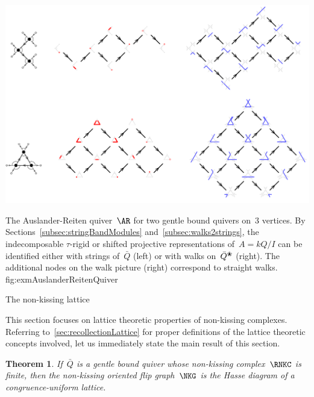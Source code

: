 \documentclass{memo-l}
\makeatletter
\newtheorem{theorem}{Theorem}[part]
\theoremstyle{definition}
\newcommand{\blossom}{^\text{\ding{96}}} %
\def\part{\@startsection{part}{1}%
\z@{.7\linespacing\@plus\linespacing}{.8\linespacing}%
{\LARGE\sffamily\centering}}
\makeatother
\begin{document}
\captionsetup{width=1.5\textwidth}
{\begin{minipage}{22cm}\vspace*{-1cm}\includegraphics[scale=.45]{exmAuslanderReitenQuiver}\end{minipage}}
{The Auslander-Reiten quiver~$\AR$ for two gentle bound quivers on~$3$ vertices. By Sections~\ref{subsec:stringBandModules} and~\ref{subsec:walks2strings}, the indecomposable $\tau$-rigid or shifted projective representations of~$A = kQ/I$ can be identified either with strings of~$\bar Q$ (left) or with walks on~$\bar Q\blossom$ (right). The additional nodes on the walk picture (right) correspond to straight walks.}
{fig:exmAuslanderReitenQuiver}
\captionsetup{width=\textwidth}


\clearpage
\part{The non-kissing lattice}
\label{part:lattice}

This section focuses on lattice theoretic properties of non-kissing complexes.
Referring to~\ref{sec:recollectionLattice} for proper definitions of the lattice theoretic concepts involved, let us immediately state the main result of this section.

\begin{theorem}
\label{thm:lattice}
If~$\bar Q$ is a gentle bound quiver whose non-kissing complex~$\RNKC$ is finite, then the non-kissing oriented flip graph~$\NKG$ is the Hasse diagram of a congruence-uniform lattice.
\end{theorem}
\end{document}
